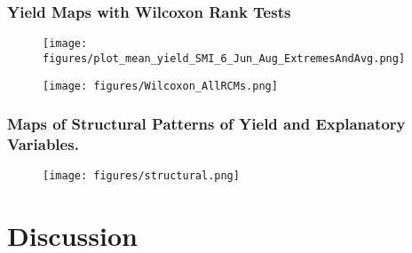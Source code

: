 \documentclass[12pt]{iopart}
\begin{document}
\subsubsection{Yield Maps with Wilcoxon Rank Tests}
\begin{figure}
	\label{map:1f}
	\centering
	\texttt{[image: figures/plot\_mean\_yield\_SMI\_6\_Jun\_Aug\_ExtremesAndAvg.png]}
	\caption{}
\end{figure}

\begin{figure}
	\label{map:2f}
	\centering
	\texttt{[image: figures/Wilcoxon\_AllRCMs.png]}
	\caption{}
\end{figure}


\subsubsection{Maps of Structural Patterns of Yield and Explanatory Variables.}
\begin{figure}
	\label{map:1f}
	\centering
	\texttt{[image: figures/structural.png]}
	\caption{}
\end{figure}







\section{Discussion}
\newcommand{\newblock}{}

%
\end{document}
